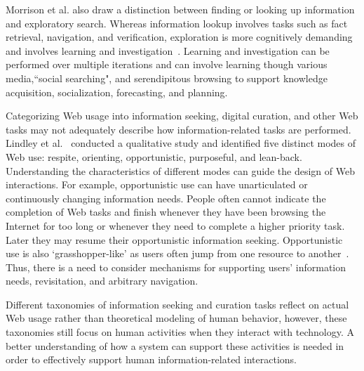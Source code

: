 \documentclass{sigchi}
\begin{document}
Morrison et al. also draw a distinction between finding or looking up information and exploratory search. Whereas information lookup involves tasks such as fact retrieval, navigation, and verification, exploration is more cognitively demanding and involves learning and investigation~\cite{marchionini2006exploratory}. Learning and investigation can be performed over multiple iterations and can involve learning though various media,``social searching", and serendipitous browsing to support knowledge acquisition, socialization, forecasting, and planning.  

Categorizing Web usage into information seeking, digital curation, and other Web tasks may not adequately describe how information-related tasks are performed. Lindley et al.~\cite{lindley2012s} conducted a qualitative study and
identified five distinct modes of Web use: respite, orienting, opportunistic, purposeful, and lean-back. 
Understanding the characteristics of different modes can guide the design of Web interactions. For example, opportunistic use can have unarticulated or continuously changing information needs. People often cannot indicate the completion of Web tasks and finish whenever they have been browsing the Internet for too long or whenever they need to complete a higher priority task. Later they may resume their opportunistic information seeking.  Opportunistic use is also `grasshopper-like' as users often jump from one resource to another~\cite{lindley2012s}.
Thus, there is a need to consider mechanisms for supporting users' information needs, revisitation, and arbitrary navigation.

Different taxonomies of information seeking and curation tasks reflect on actual Web usage rather than theoretical modeling of human behavior, however, these taxonomies still focus on human activities when they interact with technology. A better understanding of how a system can support these activities is needed in order to effectively support human information-related interactions. 
\end{document}
